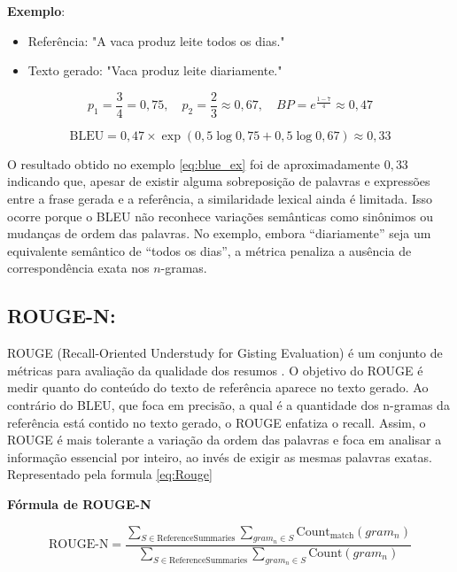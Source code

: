 \textbf{Exemplo}:
\begin{itemize}
    \item Referência: "A vaca produz leite todos os dias."
    \item Texto gerado: "Vaca produz leite diariamente."
\end{itemize}


\begin{equation}
    p_1 = \frac{3}{4} = 0{,}75, \quad p_2 = \frac{2}{3} \approx 0{,}67, \quad BP = e^{\frac{1-7}{4}} \approx 0{,}47
\end{equation}

\begin{equation}
\label{eq:blue_ex}
    \text{BLEU} = 0{,}47 \times \exp\left(0{,}5 \log 0{,}75 + 0{,}5 \log 0{,}67\right) \approx 0{,}33
\end{equation}

O resultado obtido no exemplo \ref{eq:blue_ex} foi de aproximadamente $0{,}33$ indicando que, apesar de existir alguma sobreposição de palavras e expressões entre a frase gerada e a referência, a similaridade lexical ainda é limitada. Isso ocorre porque o BLEU não reconhece variações semânticas como sinônimos ou mudanças de ordem das palavras. No exemplo, embora ``diariamente'' seja um equivalente semântico de ``todos os dias'', a métrica penaliza a ausência de correspondência exata nos $n$-gramas.



\subsection{ROUGE-N:} 
ROUGE (Recall-Oriented Understudy for Gisting Evaluation) é um conjunto de métricas para avaliação da qualidade dos resumos \cite{lin-2004-rouge}. O objetivo do ROUGE é medir quanto do conteúdo do texto de referência aparece no texto gerado. Ao contrário do BLEU, que foca em precisão, a qual é a quantidade dos n-gramas da referência está contido no texto gerado, o ROUGE enfatiza o recall. Assim, o ROUGE é mais tolerante a variação da ordem das palavras e foca em analisar a informação essencial por inteiro, ao invés de exigir as mesmas palavras exatas. Representado pela formula \ref{eq:Rouge}


\textbf{Fórmula de ROUGE-N}

\begin{equation}
\text{ROUGE-N} =
\frac{
    \sum_{S \in \text{ReferenceSummaries}} \sum_{gram_n \in S} \text{Count}_{\text{match}}(gram_n)
}{
    \sum_{S \in \text{ReferenceSummaries}} \sum_{gram_n \in S} \text{Count}(gram_n)
}
\label{eq:Rouge}
\end{equation}

